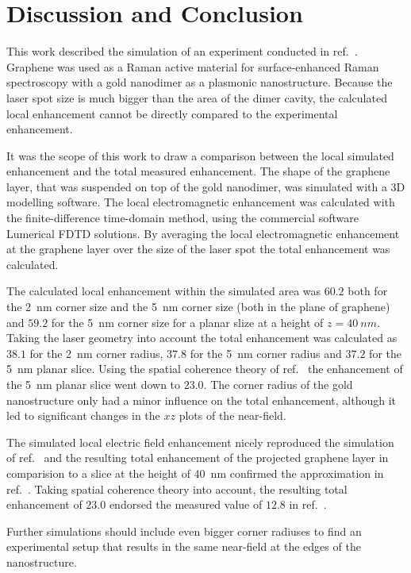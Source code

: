 \newpage
\section{Discussion and Conclusion}

This work described the simulation of an experiment conducted in ref.~\cite{heeg}. Graphene was used as a Raman active material for surface-enhanced Raman spectroscopy with a gold nanodimer as a plasmonic nanostructure. Because the laser spot size is much bigger than the area of the dimer cavity, the calculated local enhancement cannot be directly compared to the experimental enhancement.

It was the scope of this work to draw a comparison between the local simulated enhancement and the total measured enhancement. The shape of the graphene layer, that was suspended on top of the gold nanodimer, was simulated with a 3D modelling software. The local electromagnetic enhancement was calculated with the finite-difference time-domain method, using the commercial software Lumerical FDTD solutions. By averaging the local electromagnetic enhancement at the graphene layer over the size of the laser spot the total enhancement was calculated.

The calculated local enhancement within the simulated area was $60.2$  both for the \SI{2}{nm} corner size and the \SI{5}{nm} corner size (both in the plane of graphene) and $59.2$ for the \SI{5}{nm} corner size for a planar slize at a height of $z=\SI{40}{nm}$. Taking the laser geometry into account the total enhancement was calculated as $38.1$ for the \SI{2}{nm} corner radius, $37.8$ for the \SI{5}{nm} corner radius and $37.2$ for the \SI{5}{nm} planar slice. Using the spatial coherence theory of ref.~\cite{coherence} the enhancement of the \SI{5}{nm} planar slice went down to $23.0$. The corner radius of the gold nanostructure only had a minor influence on the total enhancement, although it led to significant changes in the $xz$ plots of the near-field.

The simulated local electric field enhancement nicely reproduced the simulation of ref.~\cite{heeg} and the resulting total enhancement of the projected graphene layer in comparision to a slice at the height of \SI{40}{nm} confirmed the approximation in ref.~\cite{heeg}. Taking spatial coherence theory into account, the resulting total enhancement of $23.0$ endorsed the measured value of $12.8$ in ref.~\cite{heeg}.

Further simulations should include even bigger corner radiuses to find an experimental setup that results in the same near-field at the edges of the nanostructure.
